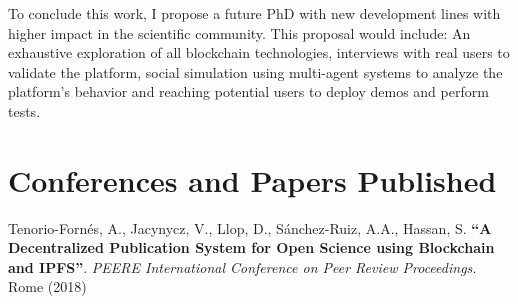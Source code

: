 To conclude this work, I propose a future PhD with new development lines with
higher impact in the scientific community. This proposal would include: An
exhaustive exploration of all blockchain technologies, interviews with real
users to validate the platform, social simulation using multi-agent systems to
analyze the platform's behavior and reaching potential users to deploy demos and
perform tests.

\section{Conferences and Papers Published}

Tenorio-Fornés, A., Jacynycz, V., Llop, D., Sánchez-Ruiz, A.A., Hassan, S.
\textbf{“A Decentralized Publication System for Open Science using Blockchain
  and IPFS”}. \emph{PEERE International Conference on Peer Review Proceedings.}
Rome (2018)

